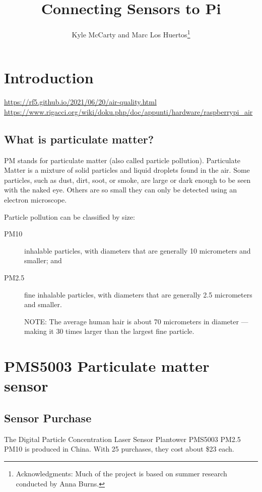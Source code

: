 \documentclass{article}
\title{Connecting Sensors to Pi}
\author{Kyle McCarty and Marc Los Huertos\footnote{Acknowledgments: Much of the project is based on summer research conducted by Anna Burns.}}
\begin{document}
\maketitle
\tableofcontents

\section{Introduction}

\url{https://rf5.github.io/2021/06/20/air-quality.html}
\url{https://www.rigacci.org/wiki/doku.php/doc/appunti/hardware/raspberrypi_air}

\subsection{What is particulate matter?}

PM stands for particulate matter (also called particle pollution). Particulate Matter is a mixture of solid particles and liquid droplets found in the air. Some particles, such as dust, dirt, soot, or smoke, are large or dark enough to be seen with the naked eye. Others are so small they can only be detected using an electron microscope.

Particle pollution can be classified by size:

\begin{description}
  \item[PM10] inhalable particles, with diameters that are generally 10 micrometers and smaller; and

  \item[PM2.5] fine inhalable particles, with diameters that are generally 2.5 micrometers and smaller.
  
NOTE: The average human hair is about 70 micrometers in diameter --- making it 30 times larger than the largest fine particle.

\end{description}

\section{PMS5003 Particulate matter sensor}

\subsection{Sensor Purchase}
The Digital Particle Concentration Laser Sensor Plantower PMS5003 PM2.5 PM10 is produced in China. With 25 purchases, they cost about \$23 each.
\end{document}
